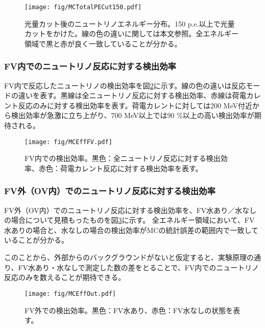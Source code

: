 \documentclass[11pt]{ltjsreport}
\newcommand{\figref}[1]{図\ref{#1}}
\begin{document}
\begin{figure}[htbp]
\centering
\texttt{[image: fig/MCTotalPECut150.pdf]}
\caption[光量カット後のニュートリノエネルギー分布]{光量カット後のニュートリノエネルギー分布。150 p.e.以上で光量カットをかけた。線の色の違いに関しては本文参照。全エネルギー領域で黒と赤が良く一致していることが分かる。}
\label{MCTotalPECut}
\end{figure}

\subsubsection{FV内でのニュートリノ反応に対する検出効率}

FV内で反応したニュートリノの検出効率を\figref{MCEffFV}に示す。線の色の違いは反応モードの違いを表す。黒線は全ニュートリノ反応に対する検出効率、赤線は荷電カレント反応のみに対する検出効率を表す。荷電カレントに対しては200 MeV付近から検出効率が急激に立ち上がり、700 MeV以上では90 \%以上の高い検出効率が期待される。

\begin{figure}[htbp]
\centering
\texttt{[image: fig/MCEffFV.pdf]}
\caption[FV内での検出効率]{FV内での検出効率。黒色：全ニュートリノ反応に対する検出効率、赤色：荷電カレント反応に対する検出効率を表す。}
\label{MCEffFV}
\end{figure}

\newpage
\subsubsection{FV外（OV内）でのニュートリノ反応に対する検出効率}

FV外（OV内）でのニュートリノ反応に対する検出効率を、FV水あり／水なしの場合について見積もったものを\figref{MCEffOut}に示す。
全エネルギー領域において、FV水ありの場合と、水なしの場合の検出効率がMCの統計誤差の範囲内で一致していることが分かる。

このことから、外部からのバックグラウンドがないと仮定すると、実験原理の通り、FV水あり・水なしで測定した数の差をとることで、FV内でのニュートリノ反応のみを数えることが期待できる。

\begin{figure}[!h]
\centering
\texttt{[image: fig/MCEffOut.pdf]}
\caption[FV外での検出効率]{FV外での検出効率。黒色：FV水あり、赤色：FV水なしの状態を表す。}
\label{MCEffOut}
\end{figure}
\end{document}
